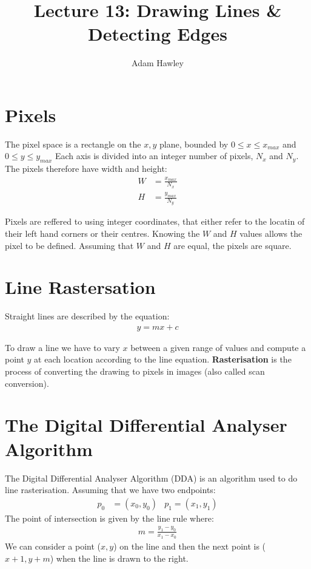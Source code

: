 \documentclass{article}
\author{Adam Hawley}
\title{Lecture 13: Drawing Lines \& Detecting Edges}
\begin{document}
\maketitle

\section{Pixels}
The pixel space is a rectangle on the $x,y$ plane, bounded by $0\le x\le x_{max}$ and $0\le y\le y_{max}$
Each axis is divided into an integer number of pixels, $N_x$ and $N_y$. The pixels therefore have width and height:
\begin{align*}
	W &= \frac{x_{max}}{N_x} \\
	H &= \frac{y_{max}}{N_y}
\end{align*}

Pixels are reffered to using integer coordinates, that either refer to the locatin of their left hand corners or their centres.
Knowing the $W$ and $H$ values allows the pixel to be defined.
Assuming that $W$ and $H$ are equal, the pixels are square.

\section{Line Rastersation}
Straight lines are described by the equation:
\begin{align*}
y = mx + c
\end{align*}

To draw a line we have to vary $x$ between a given range of values and compute a point $y$ at each location according to the line equation.
{\bf Rasterisation} is the process of converting the drawing to pixels in images (also called scan conversion).

\section{The Digital Differential Analyser Algorithm}
The Digital Differential Analyser Algorithm (DDA) is an algorithm used to do line rasterisation.
Assuming that we have two endpoints:
\begin{align*}
 p_0 &= (x_0,y_0) 
     &p_1 = (x_1,y_1)
\end{align*}
The point of intersection is given by the line rule where:
\begin{align*}
	m = \frac{y_1-y_0}{x_1-x_0}
\end{align*}
We can consider a point ($x,y$) on the line and then the next point is ($x+1,y+m$) when the line is drawn to the right.
\end{document}
